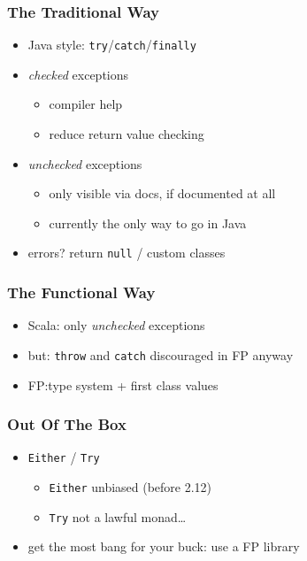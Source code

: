 \documentclass{beamer}
\begin{document}
\begin{frame}
  \frametitle{The Traditional Way}
  \begin{itemize}
  \item Java style: \texttt{try}/\texttt{catch}/\texttt{finally}
  \item \textit{checked} exceptions
    \begin{itemize}
    \item compiler help
    \item reduce return value checking
    \end{itemize}
  \item \textit{unchecked} exceptions
    \begin{itemize}
    \item only visible via docs, if documented at all
    \item currently the only way to go in Java
    \end{itemize}
  \item errors? return \texttt{null} / custom classes
  \end{itemize}
\end{frame}

\begin{frame}
  \frametitle{The Functional Way}
  \begin{itemize}
  \item Scala: only \textit{unchecked} exceptions
  \item but: \texttt{throw} and \texttt{catch} discouraged in FP anyway
  \item FP:\@ type system + first class values
  \end{itemize}
\end{frame}

\begin{frame}[fragile]
  \frametitle{Out Of The Box}
  \begin{itemize}
  \item \texttt{Either} / \texttt{Try}
    \begin{itemize}
    \item \texttt{Either} unbiased (before 2.12)
    \item \texttt{Try} not a lawful monad\dots
    \end{itemize}
  \item get the most bang for your buck: use a FP library
  \end{itemize}
\end{frame}
\end{document}
